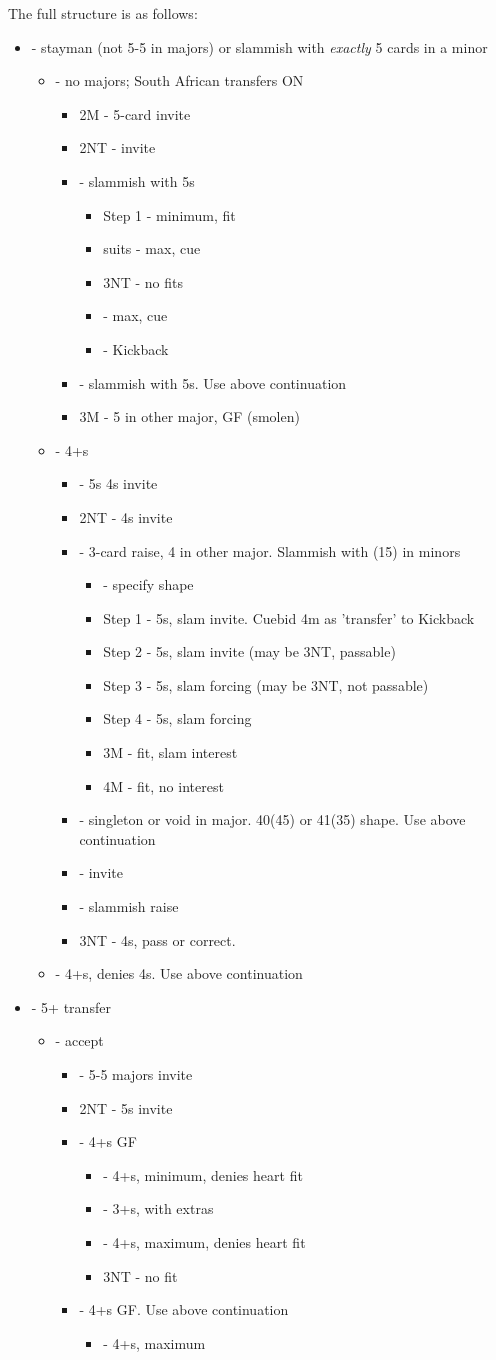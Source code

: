 \documentclass[12pt]{report}
\newcommand{\ul}[1]{\begin{itemize}#1\end{itemize}}
\newcommand{\li}{\item[~]}
\begin{document}
    The full structure is as follows:
    \ul{
        \li {} - stayman (not 5-5 in majors) or slammish with \textit{exactly} 5 cards in a minor
        \ul{
            \li \di2 - no majors; South African transfers ON
            \ul{
                \li 2M - 5-card invite
                \li 2NT - invite
                \li \cl3 - slammish with 5\cl{}s
                \ul{
                    \li Step 1 - minimum, fit
                    \li suits - max, cue
                    \li 3NT - no fits
                    \li \cl4 - max, cue
                    \li \di4 - Kickback
                }

                \li \di3 - slammish with 5\di{}s. Use above continuation

                \li 3M - 5 in other major, GF (smolen)
            }
            \li \he2 - 4+\he{}s
            \ul {
                \li \sp2 - 5\sp{}s 4\he{}s invite
                \li 2NT - 4\sp{}s invite
                \li \cl3 - 3-card raise, 4 in other major.  Slammish with (15) in minors
                \ul {
                    \li \di3 - specify shape
                        \li \qquad Step 1 - 5\cl{}s, slam invite.  Cuebid 4m as 'transfer' to Kickback
                        \li \qquad Step 2 - 5\di{}s, slam invite (may be 3NT, passable)
                        \li \qquad Step 3 - 5\cl{}s, slam forcing (may be 3NT, not passable)
                        \li \qquad Step 4 - 5\di{}s, slam forcing

                    \li 3M - fit, slam interest
                    \li 4M - fit, no interest
                }
                \li \di3 - singleton or void in major.  40(45) or 41(35) shape.  Use above continuation
                \li \he3 - invite
                \li \sp3 - slammish \he{} raise
                \li 3NT - 4\sp{}s, pass or correct.
            }

            \li \sp2 - 4+\sp{}s, denies 4\he{}s.  Use above continuation
        }
        \li \di2 - 5+\he{} transfer
        \ul {
            \li \he2 - accept
            \ul {
                \li \sp2 - 5-5 majors invite
                \li 2NT - 5\he{}s invite
                \li \cl3 - 4+\cl{}s GF
                \ul {
                    \li \di3 - 4+\cl{}s, minimum, denies heart fit
                    \li \he3 - 3+\he{}s, with extras
                    \li \sp3 - 4+\cl{}s, maximum, denies heart fit
                    \li 3NT - no fit
                }
                \li \di3 - 4+\di{}s GF.  Use above continuation
                \ul {
                    \li \cl4 - 4+\di{}s, maximum
                }
                
}}}
\end{document}
